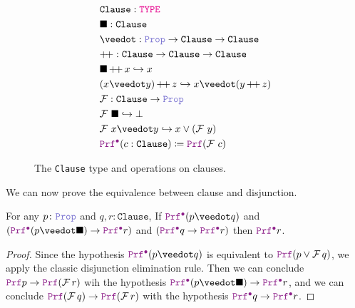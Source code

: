 \begin{figure}
  \begin{align*}
  &\texttt{Clause}: \type \\
  &\nil: \texttt{Clause} \\
  &\veedot: \prop \ra \texttt{Clause}  \ra \texttt{Clause} \\
  & \pp: \texttt{Clause} \ra \texttt{Clause} \ra \texttt{Clause} \\
  & \nil \mathop{\pp} x \re x \\
  & (x \veedot y) \mathop{\pp} z \re x \veedot (y \mathop{\pp} z) \\
  & \cal{F}: \texttt{Clause} \ra \prop \\
  & \cal{F}~\nil \re \bot\\
  & \cal{F}~x \veedot y \re x \lor (\cal{F}~y)\\
  & \pid (c : \texttt{Clause}) \coloneqq \prf (\cal{F}~c)
  \end{align*}
  \caption{The \texttt{Clause} type and operations on clauses.}
  \label{fig:encoding-clause}
\end{figure}

We can now prove the equivalence between clause and disjunction.

\begin{lemma}\label{lemma:clause-elim}
For any $p \colon \prop$ and $q,r \colon \texttt{Clause}$, If $\pid (p \veedot q)$ and $(\pid (p \veedot \nil) \ra  \pid r)$ and $(\pid q \ra  \pid r)$ then $\pid r$.
\end{lemma}
\begin{proof}
Since the hypothesis $\pid (p \veedot q)$ is equivalent to $\prf (p \lor \cal{F}\,q)$, we apply the classic disjunction elimination rule.
Then we can conclude $\prf p \ra \prf (\cal{F}\,r)$ wih the hypothesis $\pid (p \veedot \nil) \ra  \pid r$, and we can conclude $\prf (\cal{F}\,q) \ra \prf (\cal{F}\,r)$
with the hypothesis $\pid q \ra  \pid r$.
\end{proof}

\smallskip

